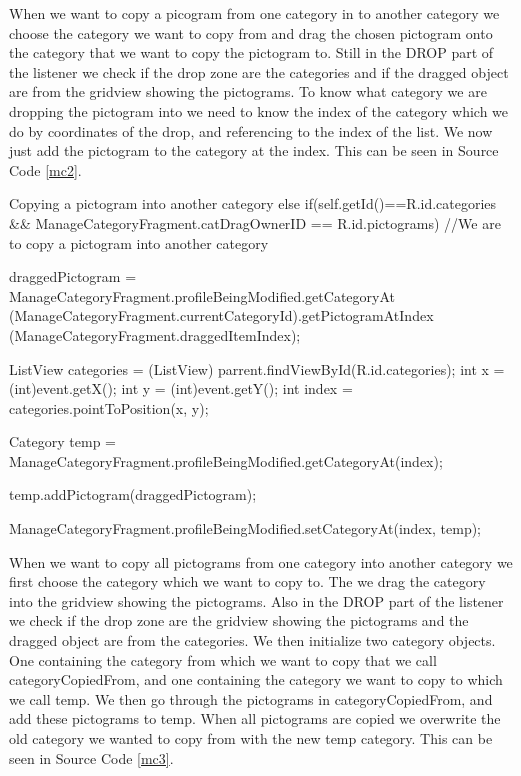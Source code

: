 When we want to copy a picogram from one category in to another category we choose the category we want to copy from and drag the chosen pictogram onto the category that we want to copy the pictogram to. 
Still in the DROP part of the listener we check if the drop zone are the categories and if the dragged object are from the gridview showing the pictograms.
To know what category we are dropping the pictogram into we need to know the index of the category which we do by coordinates of the drop, and referencing to the index of the list.
We now just add the pictogram to the category at the index.
This can be seen in Source Code \ref{mc2}.


\begin{source}[{mc2}]{Copying a pictogram into another category}
else if(self.getId()==R.id.categories && ManageCategoryFragment.catDragOwnerID == R.id.pictograms) //We are to copy a pictogram into another category
				{
					
					draggedPictogram = ManageCategoryFragment.profileBeingModified.getCategoryAt
						(ManageCategoryFragment.currentCategoryId).getPictogramAtIndex
						(ManageCategoryFragment.draggedItemIndex); 
							
					ListView categories = (ListView) parrent.findViewById(R.id.categories);
					int x = (int)event.getX();
					int y = (int)event.getY();
					int index = categories.pointToPosition(x, y);
					
					Category temp = ManageCategoryFragment.profileBeingModified.getCategoryAt(index);
					
					temp.addPictogram(draggedPictogram);
				
					ManageCategoryFragment.profileBeingModified.setCategoryAt(index, temp);
										
				}
\end{source}
When we want to copy all pictograms from one category into another category we first choose the category which we want to copy to. 
The we drag the category into the gridview showing the pictograms. 
Also in the DROP part of the listener we check if the drop zone are the gridview showing the pictograms and the dragged object are from the categories.
We then initialize two category objects. 
One containing the category from which we want to copy that we call categoryCopiedFrom, and one containing the category we want to copy to which we call temp. 
We then go through the pictograms in categoryCopiedFrom, and add these pictograms to temp. 
When all pictograms are copied we overwrite the old category we wanted to copy from with the new temp category. 
This can be seen in Source Code \ref{mc3}.

